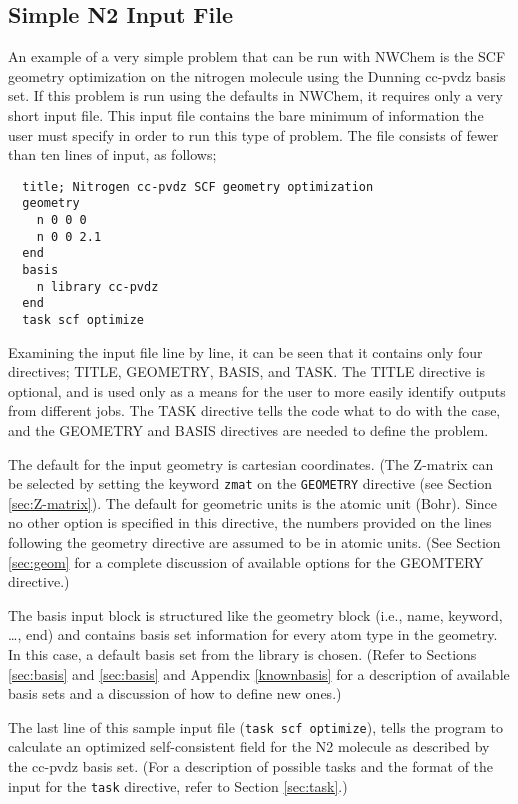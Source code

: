\subsection{Simple N2 Input File}
\label{sec:simplesample}

An example of a very simple problem that can be run with NWChem is the
SCF geometry optimization on the nitrogen molecule using the Dunning 
cc-pvdz basis set.  If this problem is run using the defaults in NWChem, 
it requires only a very short input file.  This input file contains
the bare minimum of information the user must specify in order to run 
this type of problem.  The file consists of fewer than ten lines of input,
as follows;

\begin{verbatim}
  title; Nitrogen cc-pvdz SCF geometry optimization
  geometry 
    n 0 0 0
    n 0 0 2.1
  end
  basis
    n library cc-pvdz
  end
  task scf optimize
\end{verbatim}

Examining the input file line by line, it can be seen that it contains 
only four directives; TITLE, GEOMETRY, BASIS, and TASK.  The TITLE directive
is optional, and is used only as a means for the user to more easily identify
outputs from different jobs.  The TASK directive tells the code what to
do with the case, and the GEOMETRY and BASIS directives are needed
to define the problem.

The default for the input geometry is cartesian coordinates.  (The Z-matrix
can be selected by setting the keyword \verb+zmat+ on the \verb+GEOMETRY+
directive (see Section \ref{sec:Z-matrix}).
The default for geometric units is the atomic unit (Bohr).  Since no other
option is specified in this directive, the numbers provided on the lines
following the geometry directive are assumed to be in atomic units.
(See Section \ref{sec:geom} 
for a complete discussion of available options for the 
GEOMTERY directive.) 

The basis input block is structured like the geometry block (i.e., name, keyword,
\ldots, end) and contains basis set information for every atom type in
the geometry. In this case, a default basis set from the library is
chosen.  (Refer to Sections \ref{sec:basis} and \ref{sec:basis} and
Appendix \ref{knownbasis}
for a description of available basis sets and a discussion of how to define
new ones.)

The last line of this sample input file ({\tt task scf optimize}),
tells the program to calculate an optimized self-consistent field for the
N2 molecule as described by the cc-pvdz basis set.
(For a description of possible tasks and the format of the input
for the {\tt task} directive, refer to Section \ref{sec:task}.)

